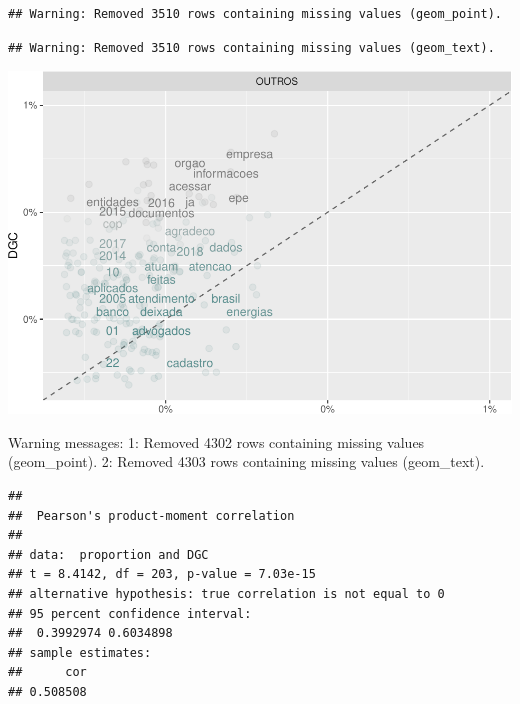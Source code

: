 \documentclass[]{article}
\newenvironment{Shaded}{\begin{snugshade}}{\end{snugshade}}
\newcommand{\KeywordTok}[1]{\textcolor[rgb]{0.13,0.29,0.53}{\textbf{#1}}}
\newcommand{\DataTypeTok}[1]{\textcolor[rgb]{0.13,0.29,0.53}{#1}}
\newcommand{\StringTok}[1]{\textcolor[rgb]{0.31,0.60,0.02}{#1}}
\newcommand{\FunctionTok}[1]{\textcolor[rgb]{0.00,0.00,0.00}{#1}}
\newcommand{\OperatorTok}[1]{\textcolor[rgb]{0.81,0.36,0.00}{\textbf{#1}}}
\newcommand{\AttributeTok}[1]{\textcolor[rgb]{0.77,0.63,0.00}{#1}}
\newcommand{\NormalTok}[1]{#1}
\begin{document}
\begin{verbatim}
## Warning: Removed 3510 rows containing missing values (geom_point).
\end{verbatim}

\begin{verbatim}
## Warning: Removed 3510 rows containing missing values (geom_text).
\end{verbatim}

\includegraphics{markdown_v31_files/figure-latex/unnamed-chunk-71-1.pdf}

\begin{Shaded}
\begin{Highlighting}[]
\FunctionTok{Warning messages:}
\FunctionTok{1:}\AttributeTok{ Removed 4302 rows containing missing values (geom_point). }
\FunctionTok{2:}\AttributeTok{ Removed 4303 rows containing missing values (geom_text).}
\end{Highlighting}
\end{Shaded}

\begin{Shaded}
\end{Shaded}

\begin{verbatim}
## 
##  Pearson's product-moment correlation
## 
## data:  proportion and DGC
## t = 8.4142, df = 203, p-value = 7.03e-15
## alternative hypothesis: true correlation is not equal to 0
## 95 percent confidence interval:
##  0.3992974 0.6034898
## sample estimates:
##      cor 
## 0.508508
\end{verbatim}
\end{document}
